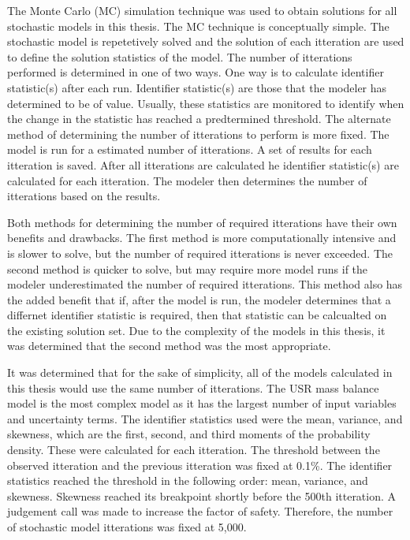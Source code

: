 \begin{linenumbers}
The Monte Carlo (MC) simulation technique was used to obtain solutions for all stochastic models in this thesis.  The MC technique is conceptually simple.  The stochastic model is repetetively solved and the solution of each itteration are used to define the solution statistics of the model.  The number of itterations performed is determined in one of two ways.  One way is to calculate identifier statistic(s) after each run.  Identifier statistic(s) are those that the modeler has determined to be of value.  Usually, these statistics are monitored to identify when the change in the statistic has reached a predtermined threshold.  The alternate method of determining the number of itterations to perform is more fixed.  The model is run for a estimated number of itterations.  A set of results for each itteration is saved.  After all itterations are calculated he identifier statistic(s) are calculated for each itteration.  The modeler then determines the number of itterations based on the results.

Both methods for determining the number of required itterations have their own benefits and drawbacks.  The first method is more computationally intensive and is slower to solve, but the number of required itterations is never exceeded.  The second method is quicker to solve, but may require more model runs if the modeler underestimated the number of required itterations.  This method also has the added benefit that if, after the model is run, the modeler determines that a differnet identifier statistic is required, then that statistic can be calcualted on the existing solution set.  Due to the complexity of the models in this thesis, it was determined that the second method was the most appropriate.

It was determined that for the sake of simplicity, all of the models calculated in this thesis would use the same number of itterations.  The USR mass balance model is the most complex model as it has the largest number of input variables and uncertainty terms.  The identifier statistics used were the mean, variance, and skewness, which are the first, second, and third moments of the probability density.  These were calculated for each itteration.  The threshold between the observed itteration and the previous itteration was fixed at 0.1\%.  The identifier statistics reached the threshold in the following order: mean, variance, and skewness.  Skewness reached its breakpoint shortly before the 500th itteration.  A judgement call was made to increase the factor of safety.  Therefore, the number of stochastic model itterations was fixed at 5,000.  


\end{linenumbers}
